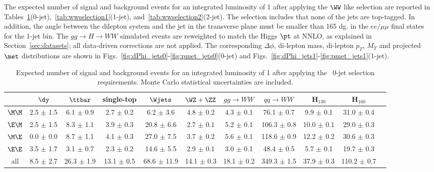 The expected number of signal and background events for an integrated 
luminosity of 1\ifb{} after applying the $\WW$ like selection are reported in 
Tables~\ref{tab:wwselection0}(0-jet),~\ref{tab:wwselection1}(1-jet), 
and~\ref{tab:wwselection2}(2-jet). The selection includes that none of the 
jets are top-tagged. In addition, the angle between the dilepton 
system and the jet in the transverse plane must be smaller than 165 dg. in 
the $ee/\mu\mu$ final states for the 1-jet bin. The $gg \to H \to WW$ 
simulated events are reweighted to match the Higgs $\pt$ at NNLO, as explained 
in Section~\ref{sec:datasets}; all data-driven corrections are not applied. The 
corresponding $\Delta\phi$, di-lepton mass, di-lepton $p_T$, $M_T$ and projected 
$\met$ distributions are shown in Figs.~\ref{fig:dPhi_jets0}-\ref{fig:pmet_jets0}(0-jet) 
and Figs.~\ref{fig:dPhi_jets1}-\ref{fig:pmet_jets1}(1-jet).

\begin{table}[!ht]
  \begin{center}
 {\scriptsize
  \begin{tabular} {|c|c|c|c|c|c|c|c|c|c|c|}
\hline
 & $\dy$ & $\ttbar$ & single-top & $\Wjets$ & $\WZ+\ZZ$ & $gg \to WW$ & $qq \to WW$ & H$_{130}$ &   H$_{160}$ \\
  \hline
  \hline
  $\M\M$   &  2.5 $\pm$   1.5 &  6.1 $\pm$   0.9 &  2.7 $\pm$	0.2 &	6.2 $\pm$   3.6&  4.8 $\pm$   0.2 &  4.3 $\pm$   0.1 & 76.1 $\pm$   0.7 &  9.9 $\pm$   0.1 & 31.0 $\pm$   0.4\\
  $\E\M$   &  2.5 $\pm$   1.5 &  8.3 $\pm$   1.1 &  3.9 $\pm$   0.3 &  20.8 $\pm$   6.6&  2.7 $\pm$   0.1 &  5.2 $\pm$   0.1 &106.3 $\pm$   0.8 & 10.0 $\pm$   0.1 & 29.0 $\pm$   0.3\\
  $\M\E$   &  0.0 $\pm$   0.0 &  8.7 $\pm$   1.1 &  4.1 $\pm$   0.3 &  27.0 $\pm$   7.5&  3.7 $\pm$   0.2 &  5.6 $\pm$   0.1 &118.6 $\pm$   0.9 & 12.2 $\pm$   0.2 & 30.6 $\pm$   0.3\\
  $\E\E$   &  3.5 $\pm$   1.7 &  3.1 $\pm$   0.7 &  2.3 $\pm$   0.2 &  14.6 $\pm$   5.5&  2.9 $\pm$   0.1 &  3.0 $\pm$   0.1 & 48.4 $\pm$   0.5 &  5.7 $\pm$   0.1 & 19.7 $\pm$	  0.3\\
  \hline
       all &  8.5 $\pm$   2.7 & 26.3 $\pm$   1.9 & 13.1 $\pm$   0.5 &  68.6 $\pm$  11.9& 14.1 $\pm$   0.3 & 18.1 $\pm$   0.2 &349.3 $\pm$   1.5 & 37.9 $\pm$   0.3 &110.2 $\pm$   0.7\\
 \hline
  \end{tabular}
  }
  \caption{Expected number of signal and background events for an 
  integrated luminosity of 1\ifb{} after applying the \ww\ 
  0-jet selection requirements. Monte Carlo statistical 
  uncertainties are included.}
   \label{tab:wwselection0}
  \end{center}
\end{table}

